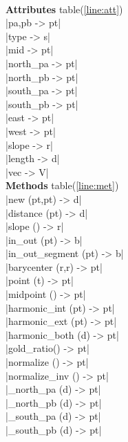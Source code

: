 \documentclass[DIV         = 14,
               fontsize    = 10,
               index       = totoc,
               twoside,
               cadre,
               headings    = small
               ]{tkz-doc}
\begin{document}
\begin{multicols}{3}
               \\
\textbf{Attributes} table(\ref{line:att})      \\
|pa,pb                     -> pt|  \\
|type                      -> s|   \\
|mid                       -> pt|  \\
|north_pa                  -> pt|  \\
|north_pb                  -> pt|  \\
|south_pa                  -> pt|  \\
|south_pb                  -> pt|  \\
|east                      -> pt|  \\
|west                      -> pt|  \\
|slope                     -> r|   \\
|length                    -> d|   \\
|vec                       -> V|  \\
\textbf{Methods} table(\ref{line:met})     \\
|new (pt,pt)               -> d|   \\
|distance (pt)             -> d|   \\
|slope ()                  -> r|   \\
|in_out (pt)               -> b|   \\
|in_out_segment (pt)       -> b|   \\
|barycenter (r,r)          -> pt|  \\
|point (t)                 -> pt|  \\
|midpoint ()               -> pt|  \\
|harmonic_int (pt)         -> pt|  \\
|harmonic_ext (pt)         -> pt|  \\
|harmonic_both (d)         -> pt|  \\
|gold_ratio()              -> pt|  \\
|normalize ()              -> pt|  \\
|normalize_inv ()          -> pt|  \\
|_north_pa (d)             -> pt|  \\
|_north_pb (d)             -> pt|  \\               
|_south_pa (d)             -> pt|  \\
|_south_pb (d)             -> pt|  \\                  

\end{multicols}
\end{document}
